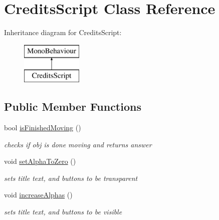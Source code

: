 \hypertarget{class_credits_script}{}\section{Credits\+Script Class Reference}
\label{class_credits_script}
Inheritance diagram for Credits\+Script\+:\begin{figure}[H]
\begin{center}
\leavevmode
\includegraphics[height=2.000000cm]{class_credits_script}
\end{center}
\end{figure}
\subsection*{Public Member Functions}
\begin{DoxyCompactItemize}
\item 
bool \hyperlink{class_credits_script_ae63ab5451f32c82bda6068facad2a213}{is\+Finished\+Moving} ()
\begin{DoxyCompactList}\small\item\em checks if obj is done moving and returns answer \end{DoxyCompactList}\item 
void \hyperlink{class_credits_script_a6a5a4968b3661e7f2ff3b609c3584957}{set\+Alpha\+To\+Zero} ()
\begin{DoxyCompactList}\small\item\em sets title text, and buttons to be transparent \end{DoxyCompactList}\item 
void \hyperlink{class_credits_script_ad37dc622426ba8d4a4b6a454d4ba81dd}{increase\+Alphas} ()
\begin{DoxyCompactList}\small\item\em sets title text, and buttons to be visible \end{DoxyCompactList}\end{DoxyCompactItemize}
